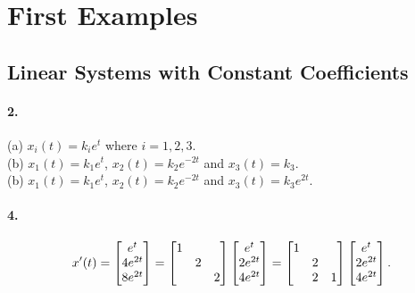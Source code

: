 \section{First Examples}

\setcounter{subsection}{1}
\subsection{Linear Systems with Constant Coefficients}
  \paragraph{2.}
  \begin{solution}
    $\,$ \\
    (a) $x_i(t)=k_i e^t$ where $i=1,2,3$. \\
    (b) $x_1(t)=k_1e^t$, $x_2(t)=k_2e^{-2t}$ and $x_3(t)=k_3$. \\
    (b) $x_1(t)=k_1e^t$, $x_2(t)=k_2e^{-2t}$ and $x_3(t)=k_3e^{2t}$.
  \end{solution}

  \paragraph{4.}
  \begin{solution}
    \[
      x^\prime(t) = 
      \begin{bmatrix}
        e^t \\ 4e^{2t} \\ 8e^{2t}  
      \end{bmatrix} =
      \begin{bmatrix}
        1 &   & \\
          & 2 & \\
          &   & 2 
      \end{bmatrix}
      \begin{bmatrix}
        e^t \\ 2e^{2t} \\ 4e^{2t}  
      \end{bmatrix} =
      \begin{bmatrix}
        1 &   &   \\
          & 2 &   \\
          & 2 & 1 
      \end{bmatrix}
      \begin{bmatrix}
        e^t \\ 2e^{2t} \\ 4e^{2t}  
      \end{bmatrix}.
    \]
  \end{solution}

